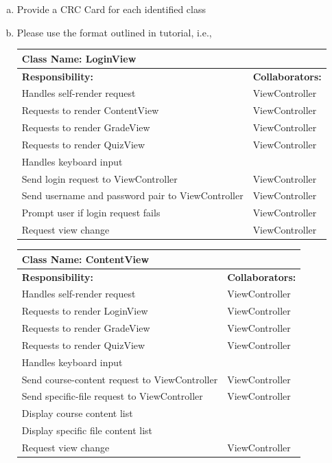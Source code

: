 \documentclass[]{article}
\begin{document}
\begin{enumerate}[a)]
	\item Provide a CRC Card for each identified class
	\item Please use the format outlined in tutorial, i.e.,

  \begin{table}[ht]
		\centering
		\begin{tabular}{|p{9cm}|p{3cm}|}
		\hline
		 \multicolumn{2}{|l|}{\textbf{Class Name:} LoginView} \\
		\hline
		\textbf{Responsibility:} & \textbf{Collaborators:} \\
		\hline
    Handles self-render request & ViewController \\
    \hline
    Requests to render ContentView & ViewController \\
    \hline
    Requests to render GradeView & ViewController \\
    \hline
    Requests to render QuizView & ViewController \\
    \hline
    Handles keyboard input & \\
    \hline
    Send login request to ViewController & ViewController \\
    \hline
    Send username and password pair to ViewController & ViewController \\
    \hline
    Prompt user if login request fails & ViewController \\
    \hline
    Request view change & ViewController \\
    \hline
		\end{tabular}
	\end{table}

  \begin{table}[ht]
		\centering
		\begin{tabular}{|p{9cm}|p{3cm}|}
		\hline
		 \multicolumn{2}{|l|}{\textbf{Class Name:} ContentView} \\
		\hline
		\textbf{Responsibility:} & \textbf{Collaborators:} \\
		\hline
    Handles self-render request & ViewController \\
    \hline
    Requests to render LoginView & ViewController \\
    \hline
    Requests to render GradeView & ViewController \\
    \hline
    Requests to render QuizView & ViewController \\
    \hline
    Handles keyboard input & \\
    \hline
    Send course-content request to ViewController & ViewController \\
    \hline
    Send specific-file request to ViewController & ViewController \\
    \hline
    Display course content list & \\
    \hline
    Display specific file content list & \\
    \hline
    Request view change & ViewController \\
    \hline
		\end{tabular}
	\end{table}


\end{enumerate}
\end{document}
